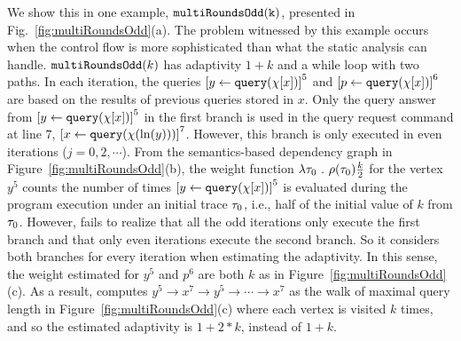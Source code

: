
 We show this in one example, $\mathtt{multiRoundsOdd(k)}$, presented in Fig.~\ref{fig:multiRoundsOdd}(a). %
The problem witnessed by this example occurs when the control flow is more sophisticated than what the static analysis can handle. 
$\mathtt{multiRoundsOdd}(k)$
has adaptivity $1 + k$ and a  while loop with two paths.
In each iteration, the queries $\clabel{\assign{y}{\query(\chi[x])}}^{5}$
and $\clabel{\assign{p}{\query(\chi[x])}}^{6}$ are based on the results of previous queries stored in $x$.
Only the query answer from $\clabel{\assign{y}{\query(\chi[x])}}^{5}$ in the first branch
is used in the query request command at line $7$, $\clabel{\assign{x}{\query(\chi(\ln(y)))} }^{7}$.
However, this branch is only executed in even iterations ($j = 0, 2, \cdots $).
From the semantics-based dependency graph in Figure~\ref{fig:multiRoundsOdd}(b),
the weight function $\lambda \mathtt{\tau}_0 ~.~ \rho(\mathtt{\tau}_0) \frac{k}{2}$ for the vertex $y^5$ counts the
number of times $\clabel{\assign{y}{\query(\chi[x])}}^{5}$ is evaluated during the program execution under an initial trace $\mathtt{\tau}_0$, i.e., half of the initial value of $k$ from $\mathtt{\tau}_0$.
However, {\THESYSTEM} fails to realize that all the odd iterations only execute the first branch
and that only even iterations execute the second branch. 
So it considers both branches for every iteration when estimating the adaptivity. 
In this sense, the weight estimated for $y^5$ and $p^6$ are both 
$k$ as in Figure~\ref{fig:multiRoundsOdd}(c).
As a result, {\THESYSTEM} computes $y^5  \to x^7  \to y^5  \to \cdots \to x^7 $
as the walk of maximal query length in Figure~\ref{fig:multiRoundsOdd}(c)
where each vertex is visited $k$ times, and so the estimated adaptivity is $1 + 2 * k$, instead of $1 + k$. 
%



